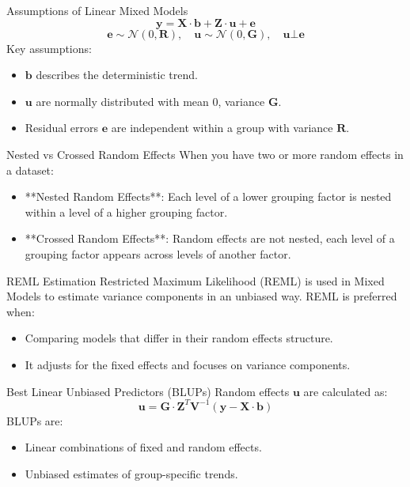 \documentclass{beamer}
\begin{document}
\begin{frame}{Assumptions of Linear Mixed Models}
\[
\mathbf{y} = \mathbf{X} \cdot \mathbf{b} + \mathbf{Z} \cdot \mathbf{u} + \mathbf{e}
\]
\[
\mathbf{e} \sim \mathcal{N}(0, \mathbf{R}), \quad \mathbf{u} \sim \mathcal{N}(0, \mathbf{G}), \quad \mathbf{u} \bot \mathbf{e}
\]
Key assumptions:
\begin{itemize}
  \item $\mathbf{b}$ describes the deterministic trend.
  \item $\mathbf{u}$ are normally distributed with mean 0, variance $\mathbf{G}$.
  \item Residual errors $\mathbf{e}$ are independent within a group with variance $\mathbf{R}$.
\end{itemize}
\end{frame}

\begin{frame}{Nested vs Crossed Random Effects}
When you have two or more random effects in a dataset:
\begin{itemize}
  \item **Nested Random Effects**: Each level of a lower grouping factor is nested within a level of a higher grouping factor.
  \item **Crossed Random Effects**: Random effects are not nested, each level of a grouping factor appears across levels of another factor.
\end{itemize}
\end{frame}

\begin{frame}{REML Estimation}
Restricted Maximum Likelihood (REML) is used in Mixed Models to estimate variance components in an unbiased way. REML is preferred when:
\begin{itemize}
  \item Comparing models that differ in their random effects structure.
  \item It adjusts for the fixed effects and focuses on variance components.
\end{itemize}
\end{frame}

\begin{frame}{Best Linear Unbiased Predictors (BLUPs)}
Random effects $\mathbf{u}$ are calculated as:
\[
\mathbf{u} = \mathbf{G} \cdot \mathbf{Z}^T \mathbf{V}^{-1} (\mathbf{y} - \mathbf{X} \cdot \mathbf{b})
\]
BLUPs are:
\begin{itemize}
  \item Linear combinations of fixed and random effects.
  \item Unbiased estimates of group-specific trends.
\end{itemize}
\end{frame}
\end{document}
